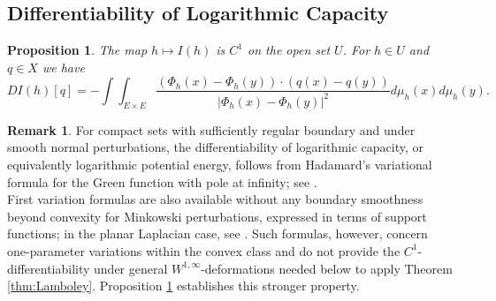 \documentclass[11pt]{article}
\theoremstyle{plain}
\numberwithin{equation}{section}
\newtheorem{proposition}[theorem]{Proposition}
\theoremstyle{definition}
\newtheorem{remark}[theorem]{Remark}
\begin{document}
    \subsection{Differentiability of Logarithmic Capacity}
    
    \begin{proposition}
        \label{prop:C1Diff}
        The map $h\mapsto I(h)$ is $C^1$ on the open set $U$. For $h \in U$ and $q \in X$ we have
        \begin{equation}
            \label{eq:GeneralKernFormDiff}
            DI(h)[q]=-\int\int_{E\times E}\frac{(\Phi_h(x)-\Phi_h(y))\cdot(q(x)-q(y))}{|\Phi_h(x)-\Phi_h(y)|^2}d\mu_h(x)d\mu_h(y).
        \end{equation}
    \end{proposition}

    \begin{remark}
        For compact sets with sufficiently regular boundary and under smooth normal perturbations, the differentiability of logarithmic capacity, or equivalently logarithmic potential energy, follows from Hadamard’s variational formula for the Green function with pole at infinity; see \cite[Section 3, formula (31)]{SchifferHadamard}.\\
        First variation formulas are also available without any boundary smoothness beyond convexity for Minkowski perturbations, expressed in terms of support functions; in the planar Laplacian case, see \cite[Proposition 10.1]{AkmanLewisSaariVogel+2021+247+302}. Such formulas, however, concern one-parameter variations within the convex class and do not provide the $C^1$-differentiability under general $W^{1,\infty}$-deformations needed below to apply Theorem \ref{thm:Lamboley}. Proposition \ref{prop:C1Diff} establishes this stronger property.
    \end{remark}
\end{document}
